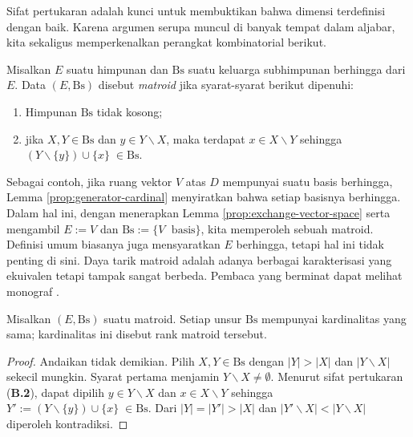 Sifat pertukaran adalah kunci untuk membuktikan bahwa dimensi terdefinisi dengan baik. Karena argumen serupa muncul di banyak tempat dalam aljabar, kita sekaligus memperkenalkan perangkat kombinatorial berikut.
\begin{definition}[H.\ Whitney]\label{def:matroid}
	Misalkan $E$ suatu himpunan dan $\text{Bs}$ suatu keluarga subhimpunan berhingga dari $E$. Data $(E, \text{Bs})$ disebut \emph{matroid} jika syarat-syarat berikut dipenuhi:
	\begin{enumerate}[\bfseries {B}.1]
		\item Himpunan $\text{Bs}$ tidak kosong;
		\item jika $X, Y \in \text{Bs}$ dan $y \in Y \smallsetminus X$, maka terdapat $x \in X \smallsetminus Y$ sehingga $(Y \smallsetminus \{y\}) \cup \{x\}\; \in \text{Bs}$.
	\end{enumerate}
\end{definition}
Sebagai contoh, jika ruang vektor $V$ atas $D$ mempunyai suatu basis berhingga, Lemma \ref{prop:generator-cardinal} menyiratkan bahwa setiap basisnya berhingga. Dalam hal ini, dengan menerapkan Lemma \ref{prop:exchange-vector-space} serta mengambil $E := V$ dan $\text{Bs} := \{ V\;\text{ basis} \}$, kita memperoleh sebuah matroid. Definisi umum biasanya juga mensyaratkan $E$ berhingga, tetapi hal ini tidak penting di sini. Daya tarik matroid adalah adanya berbagai karakterisasi yang ekuivalen tetapi tampak sangat berbeda. Pembaca yang berminat dapat melihat monograf \cite{Oxl11}. 

\begin{proposition}\label{prop:matroid-rank}
	Misalkan $(E, \mathrm{Bs})$ suatu matroid. Setiap unsur $\mathrm{Bs}$ mempunyai kardinalitas yang sama; kardinalitas ini disebut rank matroid tersebut.
\end{proposition}
\begin{proof}
	Andaikan tidak demikian. Pilih $X, Y \in \text{Bs}$ dengan $|Y| > |X|$ dan $|Y \smallsetminus X|$ sekecil mungkin. Syarat pertama menjamin $Y \smallsetminus X \neq \emptyset$. Menurut sifat pertukaran (\textbf{B.2}), dapat dipilih $y \in Y \smallsetminus X$ dan $x \in X \smallsetminus Y$ sehingga $Y' := (Y \smallsetminus \{y\}) \cup \{x\}\; \in \text{Bs}$. Dari $|Y|=|Y'| > |X|$ dan $|Y' \smallsetminus X| < |Y \smallsetminus X|$ diperoleh kontradiksi.
\end{proof}


